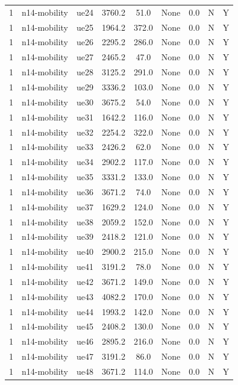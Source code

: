 \begin{table}[ht]
\begin{tabular}{|c|c|c|c|c|c|c|c|c|}
1 & n14-mobility & ue24 & 3760.2 & 51.0 & None & 0.0 & N & Y \\
1 & n14-mobility & ue25 & 1964.2 & 372.0 & None & 0.0 & N & Y \\
1 & n14-mobility & ue26 & 2295.2 & 286.0 & None & 0.0 & N & Y \\
1 & n14-mobility & ue27 & 2465.2 & 47.0 & None & 0.0 & N & Y \\
1 & n14-mobility & ue28 & 3125.2 & 291.0 & None & 0.0 & N & Y \\
1 & n14-mobility & ue29 & 3336.2 & 103.0 & None & 0.0 & N & Y \\
1 & n14-mobility & ue30 & 3675.2 & 54.0 & None & 0.0 & N & Y \\
1 & n14-mobility & ue31 & 1642.2 & 116.0 & None & 0.0 & N & Y \\
1 & n14-mobility & ue32 & 2254.2 & 322.0 & None & 0.0 & N & Y \\
1 & n14-mobility & ue33 & 2426.2 & 62.0 & None & 0.0 & N & Y \\
1 & n14-mobility & ue34 & 2902.2 & 117.0 & None & 0.0 & N & Y \\
1 & n14-mobility & ue35 & 3331.2 & 133.0 & None & 0.0 & N & Y \\
1 & n14-mobility & ue36 & 3671.2 & 74.0 & None & 0.0 & N & Y \\
1 & n14-mobility & ue37 & 1629.2 & 124.0 & None & 0.0 & N & Y \\
1 & n14-mobility & ue38 & 2059.2 & 152.0 & None & 0.0 & N & Y \\
1 & n14-mobility & ue39 & 2418.2 & 121.0 & None & 0.0 & N & Y \\
1 & n14-mobility & ue40 & 2900.2 & 215.0 & None & 0.0 & N & Y \\
1 & n14-mobility & ue41 & 3191.2 & 78.0 & None & 0.0 & N & Y \\
1 & n14-mobility & ue42 & 3671.2 & 149.0 & None & 0.0 & N & Y \\
1 & n14-mobility & ue43 & 4082.2 & 170.0 & None & 0.0 & N & Y \\
1 & n14-mobility & ue44 & 1993.2 & 142.0 & None & 0.0 & N & Y \\
1 & n14-mobility & ue45 & 2408.2 & 130.0 & None & 0.0 & N & Y \\
1 & n14-mobility & ue46 & 2895.2 & 216.0 & None & 0.0 & N & Y \\
1 & n14-mobility & ue47 & 3191.2 & 86.0 & None & 0.0 & N & Y \\
1 & n14-mobility & ue48 & 3671.2 & 114.0 & None & 0.0 & N & Y \\

\end{tabular}
\end{table}
